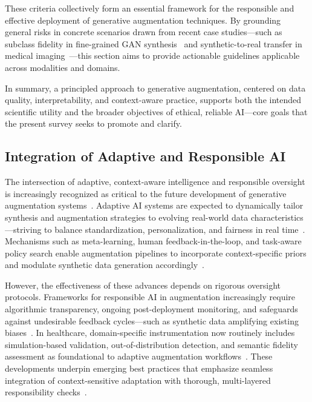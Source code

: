 \documentclass[sigconf]{acmart}
\begin{document}
These criteria collectively form an essential framework for the responsible and effective deployment of generative augmentation techniques. By grounding general risks in concrete scenarios drawn from recent case studies—such as subclass fidelity in fine-grained GAN synthesis~\cite{ref101} and synthetic-to-real transfer in medical imaging~\cite{ref81}—this section aims to provide actionable guidelines applicable across modalities and domains. 

In summary, a principled approach to generative augmentation, centered on data quality, interpretability, and context-aware practice, supports both the intended scientific utility and the broader objectives of ethical, reliable AI—core goals that the present survey seeks to promote and clarify.

\subsection{Integration of Adaptive and Responsible AI}

The intersection of adaptive, context-aware intelligence and responsible oversight is increasingly recognized as critical to the future development of generative augmentation systems~\cite{ref91,ref92,ref93,ref94,ref95}. Adaptive AI systems are expected to dynamically tailor synthesis and augmentation strategies to evolving real-world data characteristics—striving to balance standardization, personalization, and fairness in real time~\cite{ref91,ref93}. Mechanisms such as meta-learning, human feedback-in-the-loop, and task-aware policy search enable augmentation pipelines to incorporate context-specific priors and modulate synthetic data generation accordingly~\cite{ref91,ref92,ref93}.

However, the effectiveness of these advances depends on rigorous oversight protocols. Frameworks for responsible AI in augmentation increasingly require algorithmic transparency, ongoing post-deployment monitoring, and safeguards against undesirable feedback cycles—such as synthetic data amplifying existing biases~\cite{ref94,ref95,ref101}. In healthcare, domain-specific instrumentation now routinely includes simulation-based validation, out-of-distribution detection, and semantic fidelity assessment as foundational to adaptive augmentation workflows~\cite{ref87,ref101}. These developments underpin emerging best practices that emphasize seamless integration of context-sensitive adaptation with thorough, multi-layered responsibility checks~\cite{ref94,ref95,ref101}.
\end{document}
